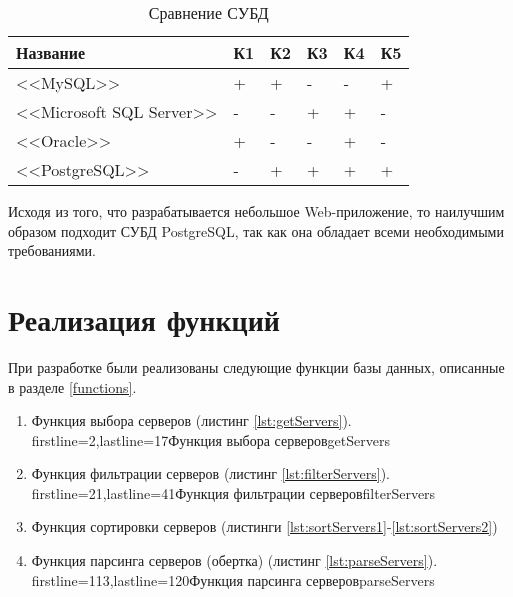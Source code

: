 \captionsetup{justification=raggedleft,singlelinecheck=off}
\begin{table}[H]
    \centering
	\caption{Сравнение СУБД}
    \label{tbl:compare_subd}
	\begin{tabular}{|l|l|l|l|l|l|}
        \hline
        \textbf{Название} & \textbf{К1} & \textbf{К2} & \textbf{К3} & \textbf{К4} & \textbf{К5} \\ \hline

        <<MySQL>>                   & + & + & - & - & + \\ \hline
        <<Microsoft SQL Server>>    & - & - & + & + & - \\ \hline
        <<Oracle>>                  & + & - & - & + & - \\ \hline
        <<PostgreSQL>>             & - & + & + & + & + \\ \hline

    \end{tabular}
\end{table}

Исходя из того, что разрабатывается небольшое Web-приложение, то наилучшим образом подходит СУБД PostgreSQL, так как она обладает всеми необходимыми требованиями.


\section{Реализация функций}

При разработке были реализованы следующие функции базы данных, описанные в разделе \ref{functions}.

\begin{enumerate}
    \item Функция выбора серверов (листинг \ref{lst:getServers}).
            {firstline=2,lastline=17}{Функция выбора серверов}{getServers}{}

    \item Функция фильтрации серверов (листинг \ref{lst:filterServers}).
            {firstline=21,lastline=41}{Функция фильтрации серверов}{filterServers}{}

    \item Функция сортировки серверов (листинги \ref{lst:sortServers1}-\ref{lst:sortServers2}) %

    \item Функция парсинга серверов (обертка) (листинг \ref{lst:parseServers}).
            {firstline=113,lastline=120}{Функция парсинга серверов}{parseServers}{}
\end{enumerate}


